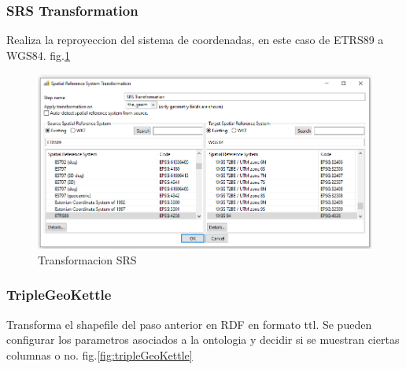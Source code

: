 \subsubsection{SRS Transformation}
Realiza la reproyeccion del sistema de coordenadas, en este caso de ETRS89 a WGS84. fig.\ref{fig:SRS}

\begin{figure}[H]
    \includegraphics[width=\textwidth]{images/SRS.png}
    \centering
    \caption{Transformacion SRS}
    \label{fig:SRS}
\end{figure}

\subsubsection{TripleGeoKettle}
Transforma el shapefile del paso anterior en RDF en formato ttl. Se pueden configurar los parametros asociados a la
ontologia y decidir si se muestran ciertas columnas o no. fig.\ref{fig:tripleGeoKettle}


